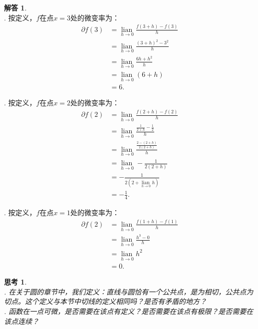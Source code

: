 \documentclass[12pt,UTF8]{ctexbook}
\newcommand{\lian}[1]{
    \underset{#1}{\operatorname{lian}\,}
}
\theoremstyle{definition}
\newtheorem*{so}{解答}
\theoremstyle{plain}
\newtheorem{sk}{思考}[section]
\begin{document}
\begin{so}
    \mbox{} \\
    . 按定义，$f$在点$x = 3$处的微变率为：
    \begin{align*}
        \partial f(3) &= \lian{h\to 0}\frac{f(3 + h) - f(3)}{h}  \\
        &= \lian{h\to 0}\frac{(3 + h)^2 - 3^2}{h}  \\
        &= \lian{h\to 0}\frac{6h + h^2}{h}  \\
        &= \lian{h\to 0}(6 + h)  \\
        &= 6.  
    \end{align*}

    . 按定义，$f$在点$x = 2$处的微变率为：
    \begin{align*}
        \partial f(2) &= \lian{h\to 0}\frac{f(2 + h) - f(2)}{h}  \\
        &= \lian{h\to 0}\frac{\frac{1}{2+h} - \frac{1}{2}}{h}  \\
        &= \lian{h\to 0}\frac{\frac{2 - (2 + h)}{2(2 + h)}}{h}  \\
        &= \lian{h\to 0}-\frac{1}{2(2 + h)}  \\
        &= -\frac{1}{2(2 + \lian{h\to 0}h)}  \\
        &= -\frac{1}{4}. 
    \end{align*}

    . 按定义，$f$在点$x = 1$处的微变率为：
    \begin{align*}
        \partial f(2) &= \lian{h\to 0}\frac{f(1 + h) - f(1)}{h}  \\
        &= \lian{h\to 0}\frac{h^3 - 0}{h}  \\
        &= \lian{h\to 0}h^2  \\
        &= 0. 
    \end{align*}
\end{so}

\begin{sk}
    \mbox{} \\
    . 在关于圆的章节中，我们定义：直线与圆恰有一个公共点，是为相切，公共点为切点。这个定义与本节中切线的定义相同吗？是否有矛盾的地方？\\
    . 函数在一点可微，是否需要在该点有定义？是否需要在该点有极限？是否需要在该点连续？
\end{sk}
\end{document}
